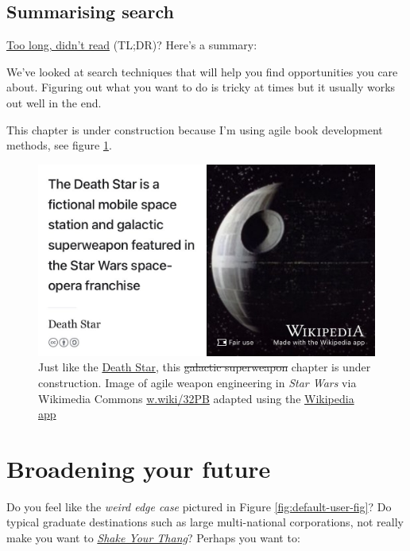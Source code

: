 \documentclass[
]{book}
\begin{document}
\hypertarget{tldr8}{%
\section{Summarising search}\label{tldr8}}

\href{https://en.wiktionary.org/wiki/too_long;_didn\%27t_read}{Too long, didn't read} (TL;DR)? Here's a summary:

We've looked at search techniques that will help you find opportunities you care about. Figuring out what you want to do is tricky at times but it usually works out well in the end.

This chapter is under construction because I'm using agile book development methods, see figure \ref{fig:deathstar5-fig}.

\begin{figure}

{\centering \includegraphics[width=0.99\linewidth]{images/DeathStar2} 

}

\caption{Just like the \href{https://en.wikipedia.org/wiki/Death_Star}{Death Star}, this \sout{galactic superweapon} chapter is under construction. Image of agile weapon engineering in \emph{Star Wars} via Wikimedia Commons \href{https://w.wiki/32PB}{w.wiki/32PB} adapted using the \href{https://apps.apple.com/gb/app/wikipedia/id324715238}{Wikipedia app}}\label{fig:deathstar5-fig}
\end{figure}

\hypertarget{broadening}{%
\chapter{Broadening your future}\label{broadening}}

Do you feel like the \emph{weird edge case} pictured in Figure \ref{fig:default-user-fig}? Do typical graduate destinations such as large multi-national corporations, not really make you want to \emph{\href{https://en.wikipedia.org/wiki/Shake_Your_Thang}{Shake Your Thang}}? \citep{saltnpepa} Perhaps you want to:
\end{document}
